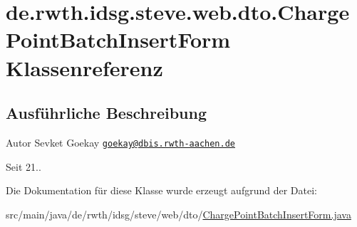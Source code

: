 \hypertarget{classde_1_1rwth_1_1idsg_1_1steve_1_1web_1_1dto_1_1_charge_point_batch_insert_form}{\section{de.\+rwth.\+idsg.\+steve.\+web.\+dto.\+Charge\+Point\+Batch\+Insert\+Form Klassenreferenz}
\label{classde_1_1rwth_1_1idsg_1_1steve_1_1web_1_1dto_1_1_charge_point_batch_insert_form}
}


\subsection{Ausführliche Beschreibung}
\begin{DoxyAuthor}{Autor}
Sevket Goekay \href{mailto:goekay@dbis.rwth-aachen.de}{\tt goekay@dbis.\+rwth-\/aachen.\+de} 
\end{DoxyAuthor}
\begin{DoxySince}{Seit}
21.. 
\end{DoxySince}


Die Dokumentation für diese Klasse wurde erzeugt aufgrund der Datei\+:\begin{DoxyCompactItemize}
\item 
src/main/java/de/rwth/idsg/steve/web/dto/\hyperlink{_charge_point_batch_insert_form_8java}{Charge\+Point\+Batch\+Insert\+Form.\+java}\end{DoxyCompactItemize}
